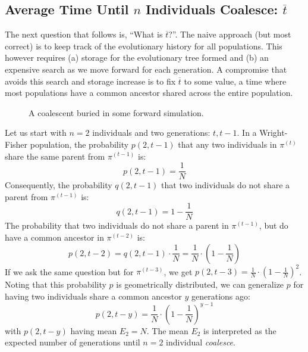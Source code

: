 \subsection{Average Time Until $n$ Individuals Coalesce: $\overbar{t}$}
\label{subsec:averageTimeUntilNIndividualsCoalesce}
The next question that follows is, ``What is $\overbar{t}$?''.
The naive approach (but most correct) is to keep track of the evolutionary history for all populations.
This however requires (a) storage for the evolutionary tree formed and (b) an expensive search as we move forward for
each generation.
A compromise that avoids this search and storage increase is to fix $\overbar{t}$ to some value, a time where most
populations have a common ancestor shared across the entire population.

\begin{figure}[t]
    \centering
    \subfloat{{  }}
    \qquad \qquad \qquad
    \subfloat{{  }}
    \caption{A coalescent buried in some forward simulation.}
    \label{fig:coalescentBuried}
\end{figure}

Let us start with $n=2$ individuals and two generations: $t, t-1$.
In a Wright-Fisher population, the probability $p(2, t-1)$ that any two individuals in $\pi^{(t)}$ share the same
parent from $\pi^{(t-1)}$ is:
\begin{equation}
    p(2, t-1) = \frac{1}{N}
\end{equation}
Consequently, the probability $q(2, t-1)$ that two individuals do not share a parent from $\pi^{(t-1)}$ is:
\begin{equation}
    q(2, t-1) = 1 - \frac{1}{N}
\end{equation}
The probability that two individuals do not share a parent in $\pi^{(t-1)}$, but do have a common ancestor
in $\pi^{(t-2)}$ is:
\begin{equation}
    p(2, t-2) = q(2, t-1) \cdot \frac{1}{N} = \frac{1}{N} \cdot \left(1 - \frac{1}{N}\right)
\end{equation}
If we ask the same question but for $\pi^{(t-3)}$, we get
$p(2, t-3) = \frac{1}{N} \cdot  \left(1 - \frac{1}{N}\right)^2$.
Noting that this probability $p$ is geometrically distributed, we can generalize $p$ for having two individuals share a
common ancestor $y$ generations ago:
\begin{equation}
    p(2, t-y) = \frac{1}{N} \cdot \left(1 - \frac{1}{N}\right)^{y-1}
\end{equation}
with $p(2, t-y)$ having mean $E_2 = N$.
The mean $E_2$ is interpreted as the expected number of generations until $n=2$ individual \emph{coalesce}.

